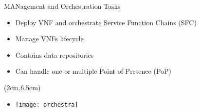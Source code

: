 \begin{frame}{MANagement and Orchestration}
  Tasks
  \begin{itemize}
  \item<1-> Deploy VNF and orchestrate Service Function Chains (SFC)
  \item<2-> Manage VNFs lifecycle
  \item<3-> Contains data repositories
  \item<4-> Can handle one or multiple Point-of-Presence (PoP)
  \end{itemize}


  \begin{textblock*}{5cm}(2cm,6.5cm)
    \begin{itemize}
    \item[] \texttt{[image: orchestra]}
    \end{itemize}
  \end{textblock*}
\end{frame}
